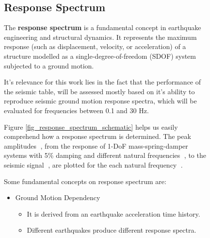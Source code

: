 \documentclass[9pt]{extarticle}
\begin{document}
\begin{figure}[H]
\begin{minipage}{0.6\textwidth}
\setlength{\parindent}{2pt}
\subsection{Response Spectrum}%

\hspace*{\parindent} The \textbf{response spectrum} is a fundamental concept in earthquake engineering and structural dynamics. It represents the maximum response (such as displacement, velocity, or acceleration) of a structure modelled as a single-degree-of-freedom (SDOF) system subjected to a ground motion. 

It's relevance for this work lies in the fact that the performance of the seismic table, will be assessed mostly based on it's ability to reproduce seismic ground motion response spectra, which will be evaluated for frequencies between 0.1 and 30 Hz.

\vspace{5mm}

\hspace*{\parindent} Figure \ref{fig_response_spectrum_schematic} helps us easily comprehend how a response spectrum is determined.  The peak amplitudes {\textcircled{}}, from the response of  1-DoF mass-spring-damper systems with 5\% damping and different natural frequencies {\textcircled{}}, to the seismic signal {\textcircled{}}, are plotted for the each natural frequency {\textcircled{}}.

\vspace{5mm}

\hspace*{\parindent} Some fundamental concepts on response spectrum are:
\begin{itemize}[noitemsep, topsep=0pt, leftmargin=*]
    \item Ground Motion Dependency
    \begin{itemize}[noitemsep, topsep=0pt, leftmargin=*]
        \item It is derived from an earthquake acceleration time history.
        \item Different earthquakes produce different response spectra.
    \end{itemize}
    

\end{itemize}
\end{minipage}
\end{figure}
\end{document}
